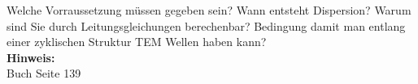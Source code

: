\begin{question}[section=5,subsection=52,name={TEM-Wellen},difficulty=6,type=mdl,mode=exm,tags={}]
	Welche Vorraussetzung müssen gegeben sein? Wann entsteht Dispersion? 
	Warum sind Sie durch Leitungsgleichungen berechenbar?
	Bedingung damit man entlang einer zyklischen Struktur TEM Wellen haben kann?
	\\ \textbf{Hinweis:}\\
	Buch Seite 139
\end{question}
\begin{solution}
	
\end{solution}